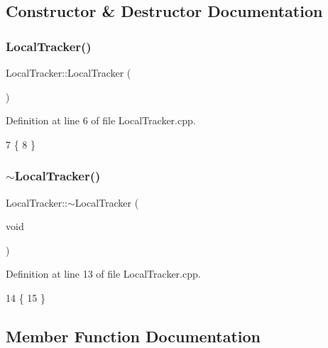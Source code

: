 \subsection{Constructor \& Destructor Documentation}
\mbox{\label{class_local_tracker_a5b29d3a99a06b3efb3ef33b64965d217}} 
\subsubsection{\texorpdfstring{Local\+Tracker()}{LocalTracker()}}
{\footnotesize\ttfamily Local\+Tracker\+::\+Local\+Tracker (\begin{DoxyParamCaption}{ }\end{DoxyParamCaption})}



Definition at line 6 of file Local\+Tracker.\+cpp.


\begin{DoxyCode}
7 \{
8 \}
\end{DoxyCode}
\mbox{\label{class_local_tracker_acf04cd253573c578a96292ba0af0dc94}} 
\subsubsection{\texorpdfstring{$\sim$\+Local\+Tracker()}{~LocalTracker()}}
{\footnotesize\ttfamily Local\+Tracker\+::$\sim$\+Local\+Tracker (\begin{DoxyParamCaption}\item[{void}]{ }\end{DoxyParamCaption})}



Definition at line 13 of file Local\+Tracker.\+cpp.


\begin{DoxyCode}
14 \{
15 \}
\end{DoxyCode}


\subsection{Member Function Documentation}
\mbox{\label{class_local_tracker_a7fad09ebaf507de2a400ec17ec96fa56}} 
